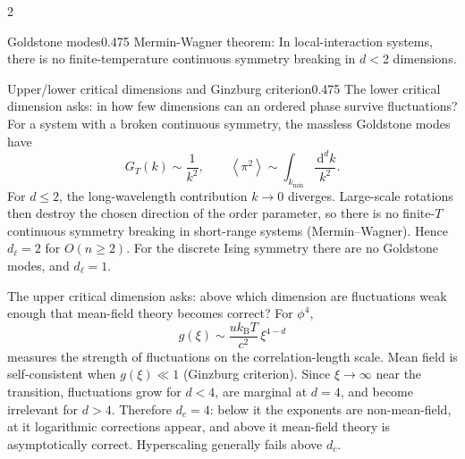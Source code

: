 \documentclass[8pt,a4paper]{extarticle}
\newcommand{\dd}{\,\mathrm d}
\newcommand{\avg}[1]{\left\langle #1\right\rangle}
\newcommand{\kb}{k_{\mathrm B}}
\begin{document}
\begin{multicols*}{2}
\begin{mytikzbox}{Goldstone modes}{0.475}
Mermin-Wagner theorem: In local-interaction systems, there is no finite-temperature continuous symmetry breaking in $d<2$ dimensions.
\end{mytikzbox}

\begin{mytikzbox}{Upper/lower critical dimensions and Ginzburg criterion}{0.475} The lower critical dimension asks: in how few dimensions can an ordered phase survive fluctuations? For a system with a broken continuous symmetry, the massless Goldstone modes have \[ G_T(k)\sim\frac{1}{k^2}, \qquad \avg{\pi^2}\sim\int_{k_{\min}}\frac{\dd^dk}{k^2}. \] For \(d\le2\), the long-wavelength contribution \(k\to0\) diverges. Large-scale rotations then destroy the chosen direction of the order parameter, so there is no finite-\(T\) continuous symmetry breaking in short-range systems (Mermin--Wagner). Hence \(d_\ell=2\) for \(O(n\ge2)\). For the discrete Ising symmetry there are no Goldstone modes, and \(d_\ell=1\). 
  
The upper critical dimension asks: above which dimension are fluctuations weak enough that mean-field theory becomes correct? For \(\phi^4\), \[ g(\xi)\sim \frac{u\kb T}{c^2}\,\xi^{4-d} \] measures the strength of fluctuations on the correlation-length scale. Mean field is self-consistent when \(g(\xi)\ll1\) (Ginzburg criterion). Since \(\xi\to\infty\) near the transition, fluctuations grow for \(d<4\), are marginal at \(d=4\), and become irrelevant for \(d>4\). Therefore \(d_c=4\): below it the exponents are non-mean-field, at it logarithmic corrections appear, and above it mean-field theory is asymptotically correct. Hyperscaling generally fails above \(d_c\). \end{mytikzbox}


\end{multicols*}
\end{document}
